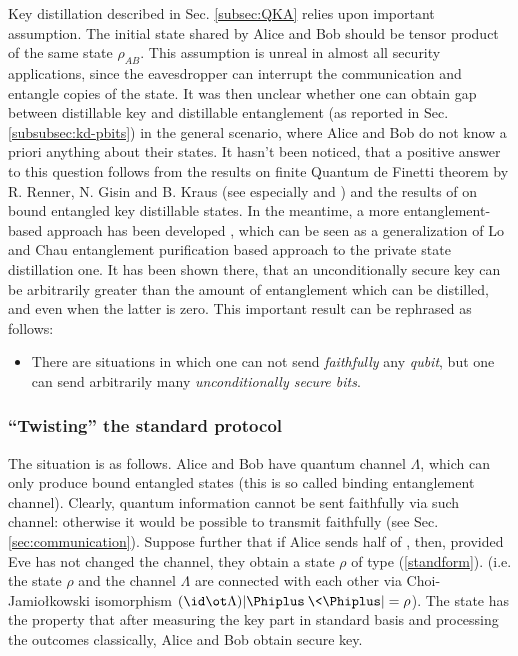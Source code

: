 \documentclass[twocolumn,aps,rmp]{revtex4}
\begin{document}
Key distillation described in Sec. \ref{subsec:QKA} relies upon
important assumption. The initial state shared by Alice and Bob
should be tensor product of the same state $\rho_{AB}$. This
assumption is unreal in almost all security applications, since the
eavesdropper can interrupt the communication and entangle copies of
the state. It was then unclear whether one can obtain gap between
distillable key and distillable entanglement (as reported in Sec.
\ref{subsubsec:kd-pbits}) in the general scenario, where Alice and
Bob do not know a priori anything about their states. It hasn't been noticed,
that a positive answer to this question follows from the results on
finite Quantum de Finetti theorem by R. Renner, N. Gisin and B.
Kraus \cite{RGKinfo_sec_proof_short,RGKinfo_sec_proof_long} (see
especially \cite{RR-phd} and \cite{KRdeFinetti}) and the results of
\cite{pptkey} on bound entangled key distillable states. In
the meantime, a more entanglement-based approach has been developed
\cite{bigkey,GeneralUncSec}, which can be seen as a
generalization of Lo and Chau entanglement purification based
approach to the private state distillation one. It has been shown
there, that an unconditionally secure key can be arbitrarily greater
than the amount of entanglement which can be distilled, and even
when the latter is zero. This important result can be rephrased as
follows:
\begin{itemize}
\item There are situations in which one can not send {\it faithfully} any {\it qubit}, but one can send arbitrarily many {\it unconditionally secure  bits}.
\end{itemize}

\subsubsection{``Twisting'' the standard protocol}

The situation is as follows. Alice and Bob have quantum channel
$\Lambda$, which can only produce bound entangled states (this is so
called binding entanglement channel). Clearly, quantum information
cannot be sent faithfully via such channel: otherwise it would be
possible to transmit faithfully  \singlets (see Sec. \ref{sec:communication}). Suppose further that if
Alice sends half of \wsinglet, then, provided Eve has not changed
the channel, they obtain a state $\rho$ of type (\ref{standform}).
(i.e. the state $\rho$ and the channel $\Lambda$ are connected with
each other via Choi-Jamio\l{}kowski isomorphism $(\id\ot
\Lambda)|\Phiplus\>\<\Phiplus|=\rho$). The state has the property that
after measuring the key part in standard basis and processing the
outcomes classically, Alice and Bob obtain secure key.
\end{document}
